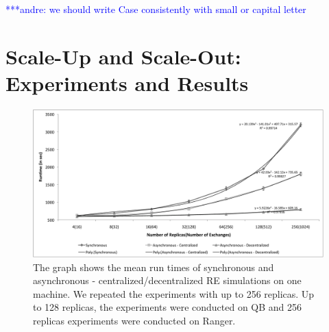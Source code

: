 \documentclass{rspublic}
\newcommand{\jhanote}[1]{ {\textcolor{red} { ***shantenu: #1 }}}
\newcommand{\alnote}[1]{ {\textcolor{blue} { ***andre: #1 }}}
\newcommand{\alnote}[1]{}
\newcommand{\jhanote}[1]{}
\begin{document}
\alnote{we should write Case consistently with small or capital letter}

\section{Scale-Up and Scale-Out: Experiments and Results}

%
\begin{figure}
\centering
\includegraphics[scale=0.50]{scale_up.pdf}
\caption{\small The graph shows the mean run times of synchronous and asynchronous - centralized/decentralized RE simulations on one machine. We repeated the experiments with up to 256 replicas. Up to 128 replicas, the experiments were conducted on QB and 256 replicas experiments were conducted on Ranger.}
\label{fig:graph}
\vspace{-1em}
\end{figure}


\end{document}

